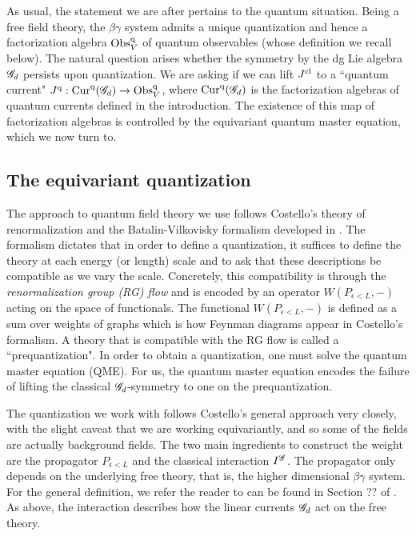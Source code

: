 As usual, the statement we are after pertains to the quantum situation. 
Being a free field theory, the $\beta\gamma$ system admits a unique quantization and hence a factorization algebra ${\rm Obs}^{{\rm q}}_V$ of quantum observables (whose definition we recall below). 
The natural question arises whether the symmetry by the dg Lie algebra $\mathscr G_d$ persists upon quantization. 
We are asking if we can lift $J^{{\rm cl}}$ to a ``quantum current" $J^{{\rm q}} : {\rm Cur}^{\rm q}(\mathscr G_d) \to {\rm Obs}^{\rm q}_V$, where ${\rm Cur}^{\rm q}(\mathscr G_d)$ is the factorization algebras of quantum currents defined in the introduction. 
The existence of this map of factorization algebras is controlled by the equivariant quantum master equation, which we now turn to.

\subsection{The equivariant quantization}

The approach to quantum field theory we use follows Costello's theory of renormalization and the Batalin-Vilkovisky formalism developed in \cite{CosRenorm}.
The formalism dictates that in order to define a quantization, it suffices to define the theory at each energy (or length) scale and to ask that these descriptions be compatible as we vary the scale.
Concretely, this compatibility is through the {\em renormalization group (RG) flow} and is encoded by an operator $W(P_{\epsilon < L}, -)$ acting on the space of functionals. 
The functional $W(P_{\epsilon < L},-)$ is defined as a sum over weights of graphs which is how Feynman diagrams appear in Costello's formalism.
A theory that is compatible with the RG flow is called a ``prequantization". 
In order to obtain a quantization, one must solve the quantum master equation (QME). 
For us, the quantum master equation encodes the failure of lifting the classical $\mathscr G_d$-symmetry to one on the prequantization.

The quantization we work with follows Costello's general approach very closely, with the slight caveat that we are working equivariantly, and so some of the fields are actually background fields. 
The two main ingredients to construct the weight are the propagator $P_{\epsilon < L}$ and the classical interaction $I^{\mathscr G}$. 
The propagator only depends on the underlying free theory, that is, the higher dimensional $\beta\gamma$ system. 
For the general definition, we refer the reader to can be found in Section ?? of \cite{CG2}.
As above, the interaction describes how the linear currents $\mathscr G_d$ act on the free theory. 

